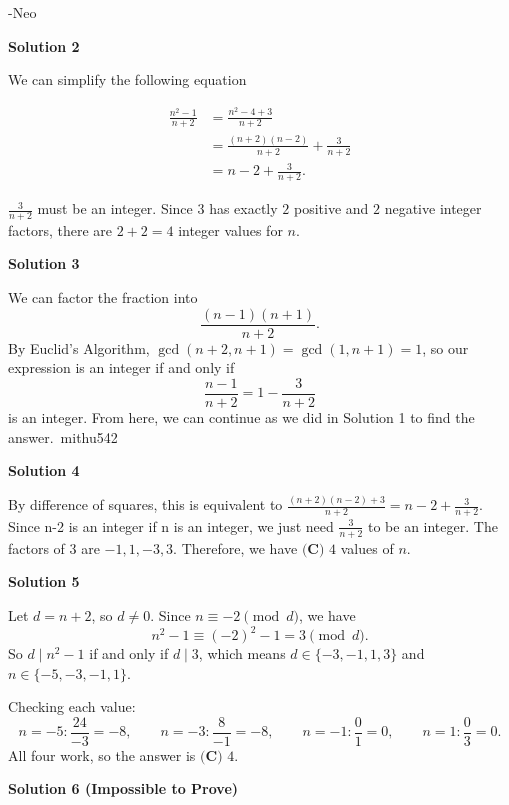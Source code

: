 \begin{enumerate}
 -Neo

 



\textbf{Solution 2}

We can simplify the following equation

 \begin{align*}\frac{n^2-1}{n+2} &= \frac{n^2-4+3}{n+2} \\[8pt]&= \frac{(n+2)(n-2)}{n+2}+\frac{3}{n+2} \\[8pt]&= n-2+\frac{3}{n+2}.\end{align*}


 $\frac{3}{n+2}$ must be an integer. Since $3$ has exactly $2$ positive and $2$ negative integer factors, there are $2+2=\boxed{4}$ integer values for $n$. 

 



\textbf{Solution 3}

We can factor the fraction into
 \[\frac{(n-1)(n+1)}{n+2}.\]By Euclid's Algorithm, $\gcd(n+2,n+1)=\gcd(1,n+1)=1$, so our expression is an integer if and only if
 \[\frac{n-1}{n+2}=1-\frac{3}{n+2}\]is an integer. From here, we can continue as we did in Solution 1 to find the answer.~mithu542

 



\textbf{Solution 4}

By difference of squares, this is equivalent to $\frac{(n+2)(n-2)+3}{n+2}=n-2+\frac{3}{{n+2}}$. Since n-2 is an integer if n is an integer, we just need $\frac{3}{n+2}$ to be an integer. The factors of $3$ are $-1, 1, -3, 3$. Therefore, we have $\boxed{\textbf{(C) } 4}$ values of $n$.

 



\textbf{Solution 5}

Let $d = n + 2$, so $d \neq 0$. Since $n \equiv -2 \pmod{d}$, we have
 \[n^2 - 1 \equiv (-2)^2 - 1 = 3 \pmod{d}.\]So $d \mid n^2 - 1$ if and only if $d \mid 3$, which means $d \in \{-3, -1, 1, 3\}$ and $n \in \{-5, -3, -1, 1\}$.

 Checking each value:
 \[n = -5: \frac{24}{-3} = -8, \qquad n = -3: \frac{8}{-1} = -8, \qquad n = -1: \frac{0}{1} = 0, \qquad n = 1: \frac{0}{3} = 0.\]All four work, so the answer is $\boxed{\textbf{(C) }4}$.

 



\textbf{Solution 6 (Impossible to Prove)}


\end{enumerate}
